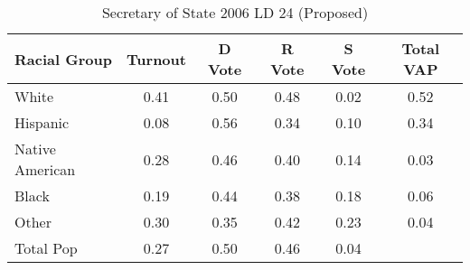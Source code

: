 \begin{table}[htb]
\begin{center}
\caption{Secretary of State 2006 LD 24 (Proposed)}
\label{sos06_vap_ld_24}
\begin{tabular}{lccccc}
  \hline
Racial Group & Turnout & D Vote & R Vote & S Vote & Total VAP \\ 
  \hline
White & 0.41 & 0.50 & 0.48 & 0.02 & 0.52 \\ 
  Hispanic & 0.08 & 0.56 & 0.34 & 0.10 & 0.34 \\ 
  Native American & 0.28 & 0.46 & 0.40 & 0.14 & 0.03 \\ 
  Black & 0.19 & 0.44 & 0.38 & 0.18 & 0.06 \\ 
  Other & 0.30 & 0.35 & 0.42 & 0.23 & 0.04 \\ 
  Total Pop & 0.27 & 0.50 & 0.46 & 0.04 &  \\ 
   \hline
\end{tabular}
\end{center}
\end{table}
